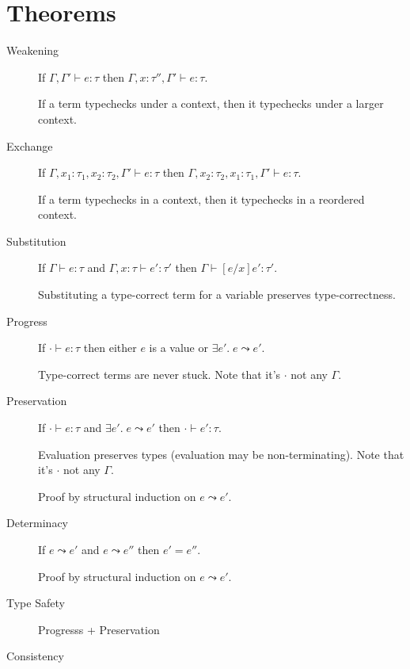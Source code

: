 \documentclass[a4paper,11pt]{article}
\begin{document}
\section{Theorems}
{
    \begin{description}
    \item[Weakening]
    {
        \hfill

        If \(\Gamma,\Gamma' \vdash e : \tau\) then \(\Gamma, x : \tau'', \Gamma' \vdash e : \tau\).

        If a term typechecks under a context, then it typechecks under a larger context.
    }
    \item[Exchange]
    {
        \hfill

        If \(\Gamma, x_1 : \tau_1, x_2 : \tau_2, \Gamma' \vdash e : \tau\) then \(\Gamma, x_2 : \tau_2, x_1 : \tau_1,
        \Gamma' \vdash e : \tau\).

        If a term typechecks in a context, then it typechecks in a reordered context.

    }
    \item[Substitution]
    {
        \hfill
        
        If \(\Gamma \vdash e : \tau\) and \(\Gamma, x : \tau \vdash e' : \tau'\) then \(\Gamma \vdash [e/x]e' : \tau'\).

        Substituting a type-correct term for a variable preserves type-correctness.
    }
    \item[Progress]
    {
        \hfill

        If \(\cdot \vdash e : \tau\) then either \(e\) is a value or \(\exists e'.\; e \leadsto e'\).

        Type-correct terms are never stuck. Note that it's \(\cdot\) not any \(\Gamma\).
    }
    \item[Preservation]
    {
        \hfill

        If \(\cdot \vdash e : \tau\) and \(\exists e'.\; e \leadsto e'\) then \(\cdot \vdash e' : \tau\).

        Evaluation preserves types (evaluation may be non-terminating). Note that it's \(\cdot\) not any \(\Gamma\).

        Proof by structural induction on \(e \leadsto e'\).
    }
    \item[Determinacy]
    {
        \hfill

        If \(e \leadsto e'\) and \(e \leadsto e''\) then \(e' = e''\).
        
        Proof by structural induction on \(e \leadsto e'\).
    }
    \item[Type Safety] Progresss + Preservation
    \item[Consistency]
    {
        \hfill

}
\end{description}}
\end{document}
